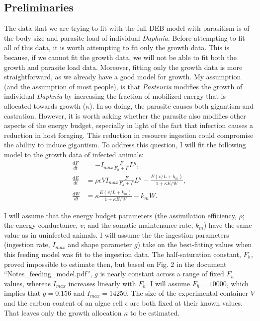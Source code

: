 \documentclass[12pt,reqno,final,pdftex]{amsart}\usepackage[]{graphicx}\usepackage[]{color}
\theoremstyle{plain}
\numberwithin{equation}{part}
\begin{document}
\subsection*{Preliminaries}
The data that we are trying to fit with the full DEB model with parasitism is of the body size and parasite load of individual \emph{Daphnia}.
Before attempting to fit all of this data, it is worth attempting to fit only the growth data.
This is because, if we cannot fit the growth data, we will not be able to fit both the growth and parasite load data.
Moreover, fitting only the growth data is more straightforward, as we already have a good model for growth.
My assumption (and the assumption of most people), is that \emph{Pasteuria} modifies the growth of individual \emph{Daphnia} by increasing the fraction of mobilized energy that is allocated towards growth ($\kappa$).
In so doing, the parasite causes both gigantism and castration.
However, it is worth asking whether the parasite also modifies other aspects of the energy budget, especially in light of the fact that infection causes a reduction in host foraging.
This reduction in resource ingestion could compromise the ability to induce gigantism.
To address this question, I will fit the following model to the growth data of infected animals:
\begin{align}
\frac{dF}{dt} &= -I_{max} \frac{F}{F_h+F} L^g, \\
\frac{dE}{dt} &= \rho \epsilon V I_{max} \frac{F}{F_h+F} L^g - \frac{E (v/L + k_m)}{1+\kappa E/W}, \\
\frac{dW}{dt} &= \kappa \frac{E (v/L + k_m)}{1+\kappa E/W} - k_m W.
\end{align}

I will assume that the energy budget parameters (the assimilation efficiency, $\rho$; the energy conductance, $v$; and the somatic maintenance rate, $k_m$) have the same value as in uninfected animals.
I will assume the the ingestion parameters (ingestion rate, $I_{max}$ and shape parameter $g$) take on the best-fitting values when this feeding model was fit to the ingestion data.
The half-saturation constant, $F_h$, proved impossible to estimate then, but based on Fig. 2 in the document ``Notes\_feeding\_model.pdf'', $g$ is nearly constant across a range of fixed $F_h$ values, whereas $I_{max}$ increases linearly with $F_h$.
I will assume $F_h=10000$, which implies that $g=0.156$ and $I_{max}=14250$.
The size of the experimental container $V$ and the carbon content of an algae cell $\epsilon$ are both fixed at their known values.
That leaves only the growth allocation $\kappa$ to be estimated.
\end{document}
